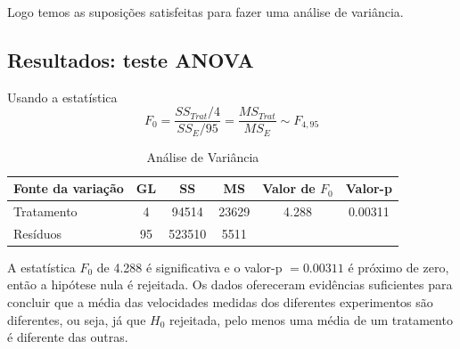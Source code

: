 \documentclass[12pt]{article}
\begin{document}
Logo temos as suposições satisfeitas para fazer uma análise de variância. 

\subsection*{Resultados: teste ANOVA}
Usando a estatística 
    \[
    F_0 = \frac{SS_{Trat}/4}{SS_{E}/95} = \frac{MS_{Trat}}{MS_{E}} \sim F_{4,95}
    \]

\begin{table}[ht]
\centering
\begin{tabular}{lccccc}
\toprule
Fonte da variação& GL & SS & MS & Valor de $F_0$ & Valor-p \\
\midrule
Tratamento & 4 & 94514 & 23629 & 4.288 & 0.00311 \\
Resíduos & 95 & 523510 & 5511 \\
\bottomrule
\end{tabular}
\caption{Análise de Variância}
\end{table}

A estatística $F_0$ de 4.288 é significativa e o valor-p $= 0.00311$ é próximo de zero,
então a hipótese nula é rejeitada.
Os dados ofereceram evidências suficientes para concluir que a média das velocidades medidas
dos diferentes experimentos são diferentes, ou seja, já que $H_0$ rejeitada, pelo menos uma média
de um tratamento é diferente das outras.
\end{document}
